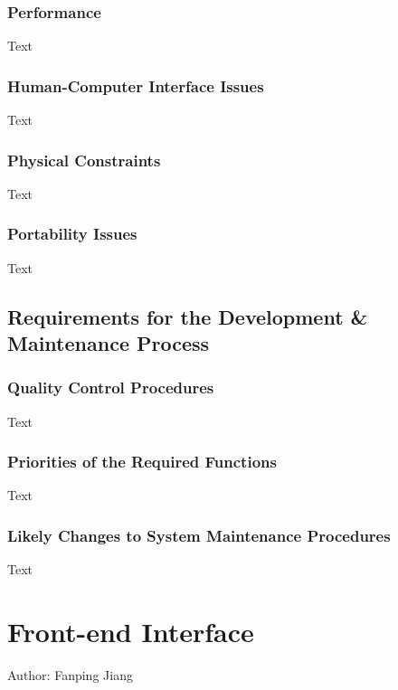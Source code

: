 \documentclass[12pt]{article}
\begin{document}
\subsubsection {Performance}

Text

\subsubsection {Human-Computer Interface Issues}

Text

\subsubsection {Physical Constraints}

Text

\subsubsection {Portability Issues}

Text

\subsection{Requirements for the Development & Maintenance Process}

\subsubsection {Quality Control Procedures}

Text

\subsubsection {Priorities of the Required Functions}

Text

\subsubsection {Likely Changes to System Maintenance Procedures}

Text

\section{Front-end Interface}
Author: Fanping Jiang\\
\end{document}
